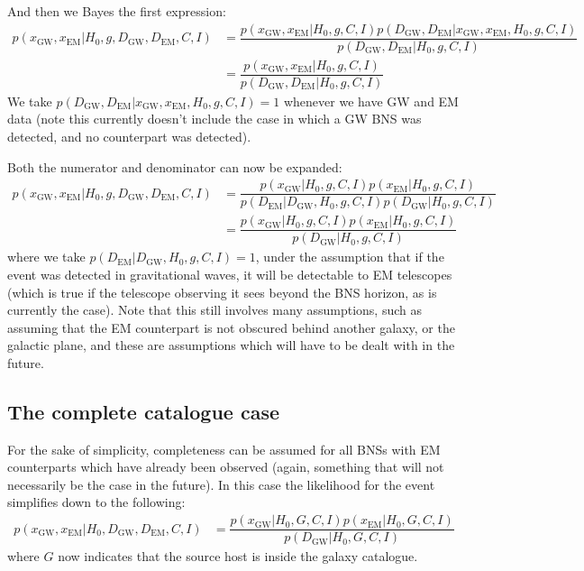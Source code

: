 \documentclass[a4paper,10pt]{article}
\begin{document}
{And then we Bayes the first expression:
\begin{equation}
\begin{aligned}
p(x_{\text{GW}},x_{\text{EM}}|H_0,g,D_{\text{GW}},D_{\text{EM}},C,I) &= \dfrac{p(x_{\text{GW}},x_{\text{EM}}|H_0,g,C,I) p(D_{\text{GW}},D_{\text{EM}}|x_{\text{GW}},x_{\text{EM}},H_0,g,C,I)}{p(D_{\text{GW}},D_{\text{EM}}|H_0,g,C,I)}
\\&= \dfrac{p(x_{\text{GW}},x_{\text{EM}}|H_0,g,C,I)}{p(D_{\text{GW}},D_{\text{EM}}|H_0,g,C,I)} 
\end{aligned} 
\end{equation}
We take $p(D_{\text{GW}},D_{\text{EM}}|x_{\text{GW}},x_{\text{EM}},H_0,g,C,I)=1$ whenever we have GW and EM data (note this currently doesn't include the case in which a GW BNS was detected, and no counterpart was detected).

Both the numerator and denominator can now be expanded:
\begin{equation}
\begin{aligned}
p(x_{\text{GW}},x_{\text{EM}}|H_0,g,D_{\text{GW}},D_{\text{EM}},C,I) &= \dfrac{p(x_{\text{GW}}|H_0,g,C,I) p(x_{\text{EM}}|H_0,g,C,I)}{p(D_{\text{EM}}|D_{\text{GW}},H_0,g,C,I) p(D_{\text{GW}}|H_0,g,C,I)} 
\\ &= \dfrac{p(x_{\text{GW}}|H_0,g,C,I) p(x_{\text{EM}}|H_0,g,C,I)}{p(D_{\text{GW}}|H_0,g,C,I)} 
\end{aligned} 
\end{equation}
where we take $p(D_{\text{EM}}|D_{\text{GW}},H_0,g,C,I) = 1$, under the assumption that if the event was detected in gravitational waves, it will be detectable to EM telescopes (which is true if the telescope observing it sees beyond the BNS horizon, as is currently the case).  Note that this still involves many assumptions, such as assuming that the EM counterpart is not obscured behind another galaxy, or the galactic plane, and these are assumptions which will have to be dealt with in the future.


\subsection{The complete catalogue case}
For the sake of simplicity, completeness can be assumed for all BNSs with EM counterparts which have already been observed (again, something that will not necessarily be the case in the future).  In this case the likelihood for the event simplifies down to the following:
\begin{equation}
\begin{aligned}
p(x_{\text{GW}},x_{\text{EM}}|H_0,D_{\text{GW}},D_{\text{EM}},C,I) &= \dfrac{p(x_{\text{GW}}|H_0,G,C,I) p(x_{\text{EM}}|H_0,G,C,I)}{p(D_{\text{GW}}|H_0,G,C,I)} 
\end{aligned} 
\end{equation}
where $G$ now indicates that the source host is inside the galaxy catalogue.




}
\end{document}
